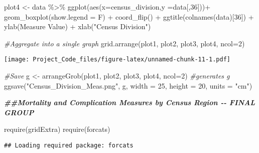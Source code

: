 \documentclass[
]{article}
\newenvironment{Shaded}{\begin{snugshade}}{\end{snugshade}}
\newcommand{\AttributeTok}[1]{\textcolor[rgb]{0.77,0.63,0.00}{#1}}
\newcommand{\CommentTok}[1]{\textcolor[rgb]{0.56,0.35,0.01}{\textit{#1}}}
\newcommand{\DecValTok}[1]{\textcolor[rgb]{0.00,0.00,0.81}{#1}}
\newcommand{\DocumentationTok}[1]{\textcolor[rgb]{0.56,0.35,0.01}{\textbf{\textit{#1}}}}
\newcommand{\FunctionTok}[1]{\textcolor[rgb]{0.00,0.00,0.00}{#1}}
\newcommand{\NormalTok}[1]{#1}
\newcommand{\OtherTok}[1]{\textcolor[rgb]{0.56,0.35,0.01}{#1}}
\newcommand{\SpecialCharTok}[1]{\textcolor[rgb]{0.00,0.00,0.00}{#1}}
\newcommand{\StringTok}[1]{\textcolor[rgb]{0.31,0.60,0.02}{#1}}
\begin{document}
\begin{Shaded}
\begin{Highlighting}[]
\NormalTok{plot4 }\OtherTok{\textless{}{-}}\NormalTok{ data }\SpecialCharTok{\%\textgreater{}\%} \FunctionTok{ggplot}\NormalTok{(}\FunctionTok{aes}\NormalTok{(}\AttributeTok{x=}\NormalTok{census\_division,}\AttributeTok{y =}\NormalTok{data[,}\DecValTok{36}\NormalTok{]))}\SpecialCharTok{+}
  \FunctionTok{geom\_boxplot}\NormalTok{(}\AttributeTok{show.legend =}\NormalTok{ F) }\SpecialCharTok{+}
  \FunctionTok{coord\_flip}\NormalTok{() }\SpecialCharTok{+}
  \FunctionTok{ggtitle}\NormalTok{(}\FunctionTok{colnames}\NormalTok{(data)[}\DecValTok{36}\NormalTok{]) }\SpecialCharTok{+} 
  \FunctionTok{ylab}\NormalTok{(}\StringTok{\textquotesingle{}Measure Value\textquotesingle{}}\NormalTok{) }\SpecialCharTok{+} \FunctionTok{xlab}\NormalTok{(}\StringTok{"Census Division"}\NormalTok{)}

\CommentTok{\#Aggregate into a single graph}
\FunctionTok{grid.arrange}\NormalTok{(plot1, plot2, plot3, plot4, }\AttributeTok{ncol=}\DecValTok{2}\NormalTok{)}
\end{Highlighting}
\end{Shaded}

\texttt{[image: Project\_Code\_files/figure-latex/unnamed-chunk-11-1.pdf]}

\begin{Shaded}
\begin{Highlighting}[]
\CommentTok{\#Save}
\NormalTok{g }\OtherTok{\textless{}{-}} \FunctionTok{arrangeGrob}\NormalTok{(plot1, plot2, plot3, plot4, }\AttributeTok{ncol=}\DecValTok{2}\NormalTok{) }\CommentTok{\#generates g}
\FunctionTok{ggsave}\NormalTok{(}\StringTok{"Census\_Division\_Meas.png"}\NormalTok{, g, }\AttributeTok{width =} \DecValTok{25}\NormalTok{, }\AttributeTok{height =} \DecValTok{20}\NormalTok{, }\AttributeTok{units =} \StringTok{"cm"}\NormalTok{)}
\end{Highlighting}
\end{Shaded}

\begin{Shaded}
\begin{Highlighting}[]
\DocumentationTok{\#\#Mortality and Complication Measures by Census Region {-}{-} FINAL GROUP}

\FunctionTok{require}\NormalTok{(gridExtra)}
\FunctionTok{require}\NormalTok{(forcats)}
\end{Highlighting}
\end{Shaded}

\begin{verbatim}
## Loading required package: forcats
\end{verbatim}
\end{document}
